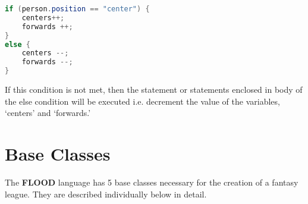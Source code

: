 \documentclass[12pt]{report}
\begin{document}
\begin{lstlisting}[language=Java,label=some-code,caption=While loop]
if (person.position == "center") {
	centers++;
	forwards ++;
}
else {
	centers --;
	forwards --;
}
\end{lstlisting}

\begin{doublespace}
If this condition is not met, then the statement or statements enclosed in body of the else condition will be executed i.e. decrement the value of the variables, `centers' and `forwards.'
\end{doublespace}

\section{Base Classes}

\begin{doublespace}
The \textbf{FLOOD} language has 5 base classes necessary for the creation of a fantasy league. They are described individually below in detail.
\end{doublespace}
\end{document}
